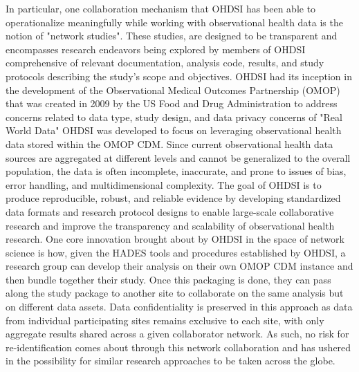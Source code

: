 \documentclass{juliacon}
\begin{document}
In particular, one collaboration mechanism that OHDSI has been able to operationalize meaningfully while working with observational health data is the notion of "network studies".
These studies, are designed to be transparent and encompasses research endeavors being explored by members of OHDSI comprehensive of relevant documentation, analysis code, results, and study protocols describing the study's scope and objectives.
OHDSI had its inception in the development of the Observational Medical Outcomes Partnership (OMOP) that was created in 2009 by the US Food and Drug Administration to address concerns related to data type, study design, and data privacy concerns of "Real World Data" \cite{ohdsi2019book} \cite{FDARealWorldEvidence}
OHDSI was developed to focus on leveraging observational health data stored within the OMOP CDM.
Since current observational health data sources are aggregated at different levels and cannot be generalized to the overall population, the data is often incomplete, inaccurate, and prone to issues of bias, error handling, and multidimensional complexity. 
The goal of OHDSI is to produce reproducible, robust, and reliable evidence by developing standardized data formats and research protocol designs to enable large-scale collaborative research and improve the transparency and scalability of observational health research. 
One core innovation brought about by OHDSI in the space of network science is how, given the HADES tools and procedures established by OHDSI, 
a research group can develop their analysis on their own OMOP CDM instance and then bundle together their study.
Once this packaging is done, they can pass along the study package to another site to collaborate on the same analysis but on different data assets.
Data confidentiality is preserved in this approach as data from individual participating sites remains exclusive to each site, with only aggregate results shared across a given collaborator network.
As such, no risk for re-identification comes about through this network collaboration and has ushered in the possibility for similar research approaches to be taken across the globe. \cite{ohdsi2019book}
\end{document}

